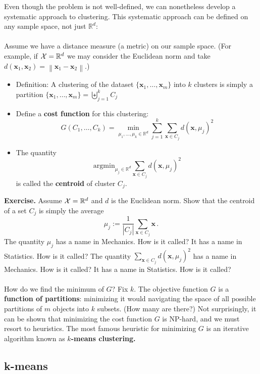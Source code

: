 \documentclass[11pt]{article}
\newcommand{\norm}[1]{\left\| #1\right\|}
\newcommand{\R}{\ensuremath{\mathbb{R}}}
\newcommand{\V}[1]{\mathbf{#1}}
\begin{document}
    Even though the problem is not well-defined, 
    we can nonetheless develop a systematic approach to clustering.
    This systematic approach can be defined on any sample space, not just
    $\R^d$: 
    \\\~\\
    Assume we have a distance measure (a metric) on our sample space. 
    (For example, if $\X=\R^d$ we may consider the Euclidean norm
    and take $d(\V{x}_1,\V{x}_2) = \norm{\V{x}_1-\V{x}_2}$.) 
    \begin{itemize}
      \item Definition: A clustering of the dataset $\{ \V{x}_1,\ldots,\V{x}_m \}$
        into $k$ clusters is simply a 
        partition $\{ \V{x}_1,\ldots,\V{x}_m \}=\biguplus_{j=1}^k C_j$
      \item Define a {\bf cost function} for this clustering: 
       \[
         G(C_1,\ldots,C_k) = \min_{\mu_1,\ldots,\mu_k\in\R^d} 
         \sum_{j=1}^k
         \sum_{\V{x}\in C_j} d(\V{x},\mu_j)^2
       \]
     \item 
       The quantity 
        \[ 
          \text{argmin}_{\mu_j\in\R^d}  \sum_{\V{x}\in C_j} d(\V{x},\mu_j)^2
        \]
       is called the {\bf centroid} of cluster $C_j$. 

       
         \end{itemize}

   {\bf Exercise.} 
   Assume $\X=\R^d$ and $d$ is the Euclidean norm.
   Show that the centroid of a set $C_j$ is simply the average
   \[
     \mu_j := \frac{1}{|C_j|} \sum_{\V{x}\in C_j} \V{x}\,.
            \]
          The quantity $\mu_j$ 
          has a name in Mechanics. How is it called? It has a name in
          Statistics. How is it called? The quantity 
          $\sum_{\V{x}\in C_j} d(\V{x},\mu_j)^2$ has a name in Mechanics. How is
          it called? It has a name in Statistics. How is it called?
\\~\\ How do we find the minimum of $G$?
   Fix $k$. The objective function $G$ is  a {\bf function of partitions}:
   minimizing it would navigating the space of all possible partitions of $m$
   objects into $k$ subsets. (How many are there?)
   Not surprisingly, it can be shown that minimizing the cost 
   function $G$ is NP-hard, and we must resort to heuristics. 
   The most famous heuristic for minimizing $G$ is an iterative algorithm known
   as {\bf $k$-means clustering.}

\subsection{k-means}
\end{document}
